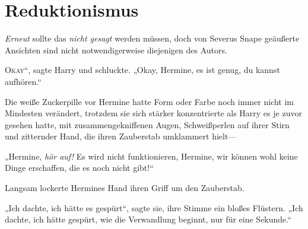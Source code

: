 \chapter{Reduktionismus}

\begin{chapterOpeningAuthorNote}
%
\emph{Erneut} sollte das \emph{nicht gesagt} werden müssen, doch von Severus Snape geäußerte Ansichten sind nicht notwendigerweise diejenigen des Autors.
\end{chapterOpeningAuthorNote}

\lettrine[ante=„]{O}{kay}“, sagte Harry und schluckte. „Okay, Hermine, es ist genug, du kannst aufhören.“

Die weiße Zuckerpille vor Hermine hatte Form oder Farbe noch immer nicht im Mindesten verändert, trotzdem sie sich stärker konzentrierte als Harry es je zuvor gesehen hatte, mit zusammengekniffenen Augen, Schweißperlen auf ihrer Stirn und zitternder Hand, die ihren Zauberstab umklammert hielt—

„Hermine, \emph{hör auf!} Es wird nicht funktionieren, Hermine, wir können wohl keine Dinge erschaffen, die es noch nicht gibt!“

Langsam lockerte Hermines Hand ihren Griff um den Zauberstab.

„Ich dachte, ich hätte es gespürt“, sagte sie, ihre Stimme ein bloßes Flüstern. „Ich dachte, ich hätte gespürt, wie die Verwandlung beginnt, nur für eine Sekunde.“

